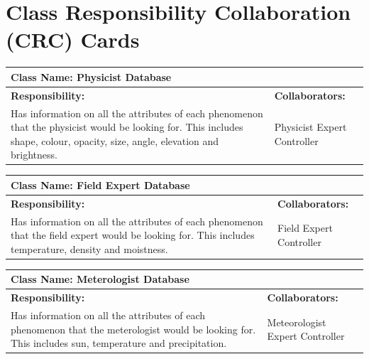 \documentclass[]{article}
\begin{document}

	
\section{Class Responsibility Collaboration (CRC) Cards}
\label{sec:class_responsibility_collaboration_crc_cards}


	\begin{table}[!hb]
		\centering
		\begin{tabular}{|p{5cm}|p{5cm}|}
		\hline 
		 \multicolumn{2}{|l|}{\textbf{Class Name: Physicist Database}} \\
		\hline
		\textbf{Responsibility:} & \textbf{Collaborators:} \\
		\hline
		Has information on all the attributes of each phenomenon that the physicist would be looking for. This includes shape, colour, opacity, size, angle, elevation and brightness. & Physicist Expert Controller \\
		\hline
		\end{tabular}
	\end{table}
	
\pagebreak

	\begin{table}[!hb]
		\centering
		\begin{tabular}{|p{5cm}|p{5cm}|}
		\hline 
		 \multicolumn{2}{|l|}{\textbf{Class Name:  Field Expert Database}} \\
		\hline
		\textbf{Responsibility:} & \textbf{Collaborators:} \\
		\hline
		Has information on all the attributes of each phenomenon that the field expert would be looking for. This includes  temperature, density and 			moistness.  & Field Expert Controller\\
		\hline
		\end{tabular}
	\end{table}

 

	\begin{table}[!hb]
		\centering
		\begin{tabular}{|p{5cm}|p{5cm}|}
		\hline 
		 \multicolumn{2}{|l|}{\textbf{Class Name: Meterologist Database}} \\
		\hline
		\textbf{Responsibility:} & \textbf{Collaborators:} \\
		\hline
		Has information on all the attributes of each phenomenon that the meterologist would be looking for. This includes sun, temperature and precipitation. & Meteorologist Expert Controller\\
		\hline
		\end{tabular}
	\end{table}
\end{document}
